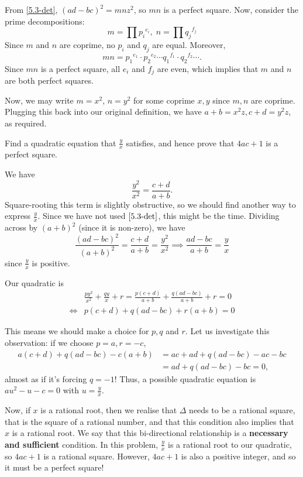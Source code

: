 \documentclass[../main.tex]{subfiles}
\begin{document}
From \eqref{5.3-det}, $(ad-bc)^2=mnz^2$, so $mn$ is a perfect square. Now, consider the prime decompositions:
    $$m = \prod {p_i}^{e_i}, \;n = \prod {q_j}^{f_j}$$
Since $m$ and $n$ are coprime, no $p_i$ and $q_j$ are equal.
Moreover,
$$mn = {p_1}^{e_1}\cdot{p_2}^{e_2}\cdots{q_1}^{f_1}\cdot{q_2}^{f_2}\cdots.$$
Since $mn$ is a perfect square, all $e_i$ and $f_j$ are even, which implies that $m$ and $n$ are both perfect squares.

Now, we may write $m=x^2$, $n=y^2$ for some coprime $x,y$ since $m, n$ are coprime. Plugging this back into our original definition, we have $a+b=x^2z, c+d=y^2z$, as required.
\begin{example}[cont.]
Find a quadratic equation that $\frac{y}{x}$ satisfies, and hence prove that $4ac+1$ is a perfect square.
\end{example}
We have
$$\frac{y^2}{x^2}=\frac{c+d}{a+b}.$$
Square-rooting this term is slightly obstructive, so we should find another way to express $\frac{y}{x}$. Since we have not used $\eqref{5.3-det}$, this might be the time. Dividing across by $(a+b)^2$ (since it is non-zero), we have
$$\frac{(ad-bc)^2}{(a+b)^2}=\frac{c+d}{a+b}=\frac{y^2}{x^2} \implies \frac{ad-bc}{a+b}=\frac{y}{x}$$
since $\frac{y}{x}$ is positive.

Our quadratic is
\begin{align*}
   &\frac{py^2}{x^2}+\frac{qy}{x}+r=\frac{p(c+d)}{a+b}+\frac{q(ad-bc)}{a+b}+r=0 \\
   \Longleftrightarrow &p(c+d)+q(ad-bc)+r(a+b)=0
\end{align*}

This means we should make a choice for $p, q$ and $r$. Let us investigate this observation: if we choose $p=a, r=-c$,
\begin{align*}
    a(c+d)+q(ad-bc)-c(a+b)&=ac+ad+q(ad-bc)-ac-bc\\
    &=ad+q(ad-bc)-bc=0,
\end{align*}
almost as if it's forcing $q=-1$!
Thus, a possible quadratic equation is $au^2-u-c=0$ with $u=\frac{y}{x}$.

Now, if $x$ is a rational root, then we realise that $\Delta$ needs to be a rational square, that is the square of a rational number, and that this condition also implies that $x$ is a rational root. We say that this bi-directional relationship is a \textbf{necessary and sufficient} condition. In this problem, $\frac{y}{x}$ is a rational root to our quadratic, so $4ac+1$ is a rational square. However, $4ac+1$ is also a positive integer, and so it must be a perfect square!
\end{document}
